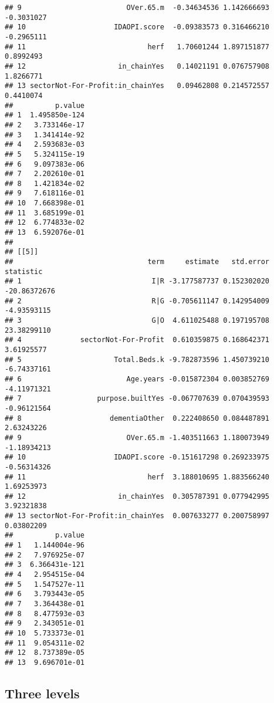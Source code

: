 \documentclass[]{article}
\newenvironment{Shaded}{\begin{snugshade}}{\end{snugshade}}
\newcommand{\KeywordTok}[1]{\textcolor[rgb]{0.13,0.29,0.53}{\textbf{{#1}}}}
\newcommand{\DataTypeTok}[1]{\textcolor[rgb]{0.13,0.29,0.53}{{#1}}}
\newcommand{\StringTok}[1]{\textcolor[rgb]{0.31,0.60,0.02}{{#1}}}
\newcommand{\NormalTok}[1]{{#1}}
\begin{document}
\begin{verbatim}
## 9                         OVer.65.m  -0.34634536 1.142666693  -0.3031027
## 10                     IDAOPI.score  -0.09383573 0.316466210  -0.2965111
## 11                             herf   1.70601244 1.897151877   0.8992493
## 12                      in_chainYes   0.14021191 0.076757908   1.8266771
## 13 sectorNot-For-Profit:in_chainYes   0.09462808 0.214572557   0.4410074
##          p.value
## 1  1.495850e-124
## 2   3.733146e-17
## 3   1.341414e-92
## 4   2.593683e-03
## 5   5.324115e-19
## 6   9.097383e-06
## 7   2.202610e-01
## 8   1.421834e-02
## 9   7.618116e-01
## 10  7.668398e-01
## 11  3.685199e-01
## 12  6.774833e-02
## 13  6.592076e-01
## 
## [[5]]
##                                term     estimate   std.error    statistic
## 1                               I|R -3.177587737 0.152302020 -20.86372676
## 2                               R|G -0.705611147 0.142954009  -4.93593115
## 3                               G|O  4.611025488 0.197195708  23.38299110
## 4              sectorNot-For-Profit  0.610359875 0.168642371   3.61925577
## 5                      Total.Beds.k -9.782873596 1.450739210  -6.74337161
## 6                         Age.years -0.015872304 0.003852769  -4.11971321
## 7                  purpose.builtYes -0.067707639 0.070439593  -0.96121564
## 8                     dementiaOther  0.222408650 0.084487891   2.63243226
## 9                         OVer.65.m -1.403511663 1.180073949  -1.18934213
## 10                     IDAOPI.score -0.151617298 0.269233975  -0.56314326
## 11                             herf  3.188010695 1.883566240   1.69253973
## 12                      in_chainYes  0.305787391 0.077942995   3.92321838
## 13 sectorNot-For-Profit:in_chainYes  0.007633277 0.200758997   0.03802209
##          p.value
## 1   1.144004e-96
## 2   7.976925e-07
## 3  6.366431e-121
## 4   2.954515e-04
## 5   1.547527e-11
## 6   3.793443e-05
## 7   3.364438e-01
## 8   8.477593e-03
## 9   2.343051e-01
## 10  5.733373e-01
## 11  9.054311e-02
## 12  8.737389e-05
## 13  9.696701e-01
\end{verbatim}

\subsection{Three levels}\label{three-levels}

\begin{Shaded}
\end{Shaded}
\end{document}
